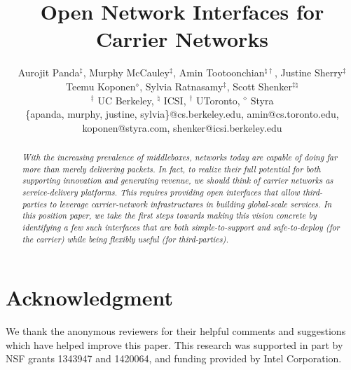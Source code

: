 \documentclass{sigcomm-alternate}[10pt,letterpaper]
\begin{document}
\title{Open Network Interfaces for Carrier Networks}
\author{Aurojit Panda$^\ddag$, Murphy McCauley$^\ddag$, Amin Tootoonchian$^{\natural\dag}$, Justine Sherry$^\ddag$\\
Teemu Koponen$^\diamond$, Sylvia Ratnasamy$^\ddag$, Scott Shenker$^{\ddag\natural}$\\
\rm{$^\ddag$ UC Berkeley, $^\natural$ ICSI, $^\dag$ UToronto, $^\diamond$ Styra}\\
\rm{\{apanda, murphy, justine, sylvia\}@cs.berkeley.edu, amin@cs.toronto.edu, koponen@styra.com, shenker@icsi.berkeley.edu\vspace{-2.4in}}
}
\date{}
\maketitle
\begin{abstract}
{\em With the increasing prevalence of middleboxes, networks today are capable of doing far more than merely delivering packets. In fact, to realize their full potential for both supporting innovation and generating revenue, we should think of carrier networks as service-delivery platforms. This requires providing open interfaces that allow third-parties to leverage carrier-network infrastructures in building global-scale services. In this position paper, we take the first steps towards making this vision concrete by identifying a few such interfaces that are both simple-to-support and safe-to-deploy (for the carrier) while being flexibly useful (for third-parties).
}
\end{abstract}



%




\section{Acknowledgment}
We thank the anonymous reviewers for their helpful comments and suggestions which have helped improve this paper. This research was supported in part by NSF grants 1343947 and 1420064, and funding provided by Intel Corporation.
\balance
  
  
\end{document}

